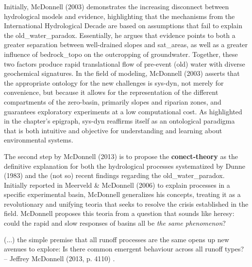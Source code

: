 \documentclass[./main_en.tex]{subfiles}
\begin{document}
\par Initially, McDonnell (2003) demonstrates the increasing disconnect between hydrological models and evidence, highlighting that the mechanisms from the International Hydrological Decade are based on assumptions that fail to explain the \gls{old_water_paradox}. Essentially, he argues that evidence points to both a greater separation between well-drained slopes and \gls{sat_areas}, as well as a greater influence of \gls{bedrock_topo} on the outcropping of groundwater. Together, these two factors produce rapid translational flow of pre-event (old) water with diverse geochemical signatures. In the field of modeling, McDonnell (2003) asserts that the appropriate ontology for the new challenges is \gls{sys-dyn}, not merely for convenience, but because it allows for the representation of the different compartments of the \gls{zero-basin}, primarily slopes and riparian zones, and guarantees exploratory experiments at a low computational cost. As highlighted in the chapter's epigraph, \gls{sys-dyn} reaffirms itself as an ontological \gls{paradigma} that is both intuitive and objective for understanding and learning about environmental systems.

\par The second step by McDonnell (2013) is to propose the \textbf{\gls{conect-theory}} as the definitive explanation for both the hydrological processes systematized by Dunne (1983) and the (not so) recent findings regarding the \gls{old_water_paradox}. Initially reported in Meerveld \& McDonnell (2006) \cite{Meerveld2006b} to explain processes in a specific experimental basin, McDonnell generalizes his concepts, treating it as a revolutionary and unifying \gls{teoria} that seeks to resolve the crisis established in the field. McDonnell proposes this \gls{teoria} from a question that sounds like heresy: could the rapid and slow responses of basins all be \textit{the same phenomenon}?

\begin{adjustwidth}{100pt}{0pt}
\medskip
\small (...) the simple premise that all runoff processes are the same opens up new avenues to explore: Is there common emergent behaviour across all runoff types? -- Jeffrey McDonnell (2013, p. 4110) \cite{Mcdonnell2013}.
\medskip
\end{adjustwidth}
\end{document}
